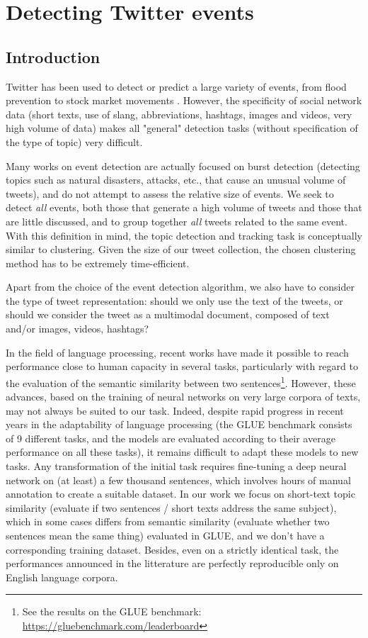 \chapter{Detecting Twitter events}


\section{Introduction}
Twitter has been used to detect or predict a large variety of events,
from flood prevention \cite{de2017towards} to stock market movements
\cite{pagolu2016sentiment}. However, the specificity of social network data (short texts, use of
slang, abbreviations, hashtags, images and videos, very
high volume of data) makes all "general" detection tasks
(without specification
of the type of topic)
very difficult.

Many works on event detection are actually
focused on burst detection (detecting topics such as
natural disasters, attacks, etc., that cause an unusual
volume of tweets), and do not attempt to assess the
relative size of events. We seek to detect \textit{all} events, both
those that generate a high volume of tweets and those that
are little discussed, and to group together \textit{all} tweets
related to the same event. With this definition in mind, the
topic detection and tracking task is conceptually similar to 
clustering. Given the size of our tweet collection, 
the chosen clustering method has to be extremely time-efficient.

Apart from the choice of the event detection algorithm, 
we also have to consider the type of tweet representation: 
should we only use the text of the tweets, or should we consider 
the tweet as a multimodal document, composed of text and/or images, videos, hashtags?

In the field of language processing, recent works
have made it possible to reach performance close to human capacity
in several tasks, 
particularly with regard to the evaluation of the semantic similarity 
between two sentences\footnote{See the results on the GLUE benchmark: \url{https://gluebenchmark.com/leaderboard}}. However, these advances, 
based on the training of neural networks on very large corpora of texts,
may not always be suited to our task. Indeed, despite rapid progress 
in recent years in the adaptability of
language processing (the GLUE benchmark \cite{wang2018glue} consists of
9 different tasks, and the models are evaluated according to their average performance on
all these tasks), it remains difficult to adapt these models to new tasks. 
Any transformation of the initial task requires fine-tuning a deep neural network 
on (at least) a few thousand sentences, which
involves hours of manual annotation to create a suitable dataset. 
In our work we focus on short-text topic similarity (evaluate if two sentences / short texts
address the same subject), which in some cases differs from semantic similarity
(evaluate whether two sentences mean the same thing) evaluated in GLUE, and we don't 
have a corresponding training dataset. Besides, even on a strictly identical
task, the performances announced in the litterature are perfectly reproducible 
only on English language corpora. 

